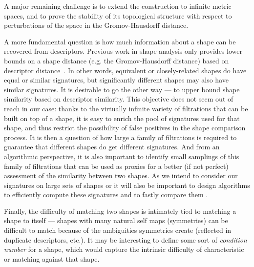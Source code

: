 A major remaining challenge is to extend the
construction to infinite metric spaces, and to prove the stability of
its topological structure with respect to perturbations of the space
in the Gromov-Hausdorff distance.

A more fundamental question is how much information about a shape can
be recovered from descriptors. Previous work in shape analysis only
provides lower bounds on a shape distance (e.g. the Gromov-Hausdorff
distance) based on descriptor distance~\cite{survey-on-signatures}. In
other words, equivalent or closely-related shapes do have equal or
similar signatures, but significantly different shapes may also have
similar signatures. It is desirable to go the other way --- to upper
bound shape similarity based on descriptor similarity. This objective
does not seem out of reach in our case: thanks to the virtually
infinite variety of filtrations that can be built on top of a shape,
it is easy to enrich the pool of signatures used for that shape, and
thus restrict the possibility of false positives in the shape
comparison process. It is then a question of how large a family of
filtrations is required to guarantee that different shapes do get
different signatures. And from an algorithmic perspective, it is also
important to identify small samplings of this family of filtrations
that can be used as proxies for a better (if not perfect) assessment
of the similarity between two shapes. 
As we intend to consider our signatures on large sets of shapes or it will also be important to design algorithms to efficiently compute these signatures 
and to fastly compare them .

Finally, the difficulty of matching two shapes is
intimately tied to matching a shape to itself --- shapes with many
natural self maps (symmetries) can be difficult to match because of
the ambiguities symmetries create (reflected in duplicate descriptors,
etc.). It may be interesting to define some sort of {\em condition
  number} for a shape, which would capture the intrinsic difficulty of
characteristic or matching against that shape.



